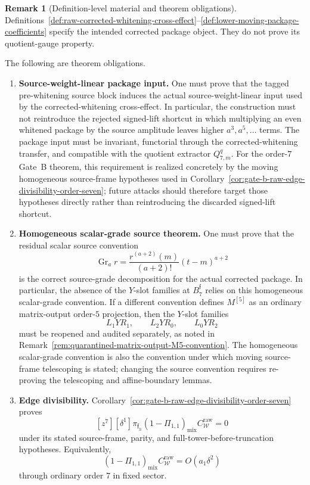 \documentclass[11pt,a4paper]{amsart}
\theoremstyle{plain}
\theoremstyle{definition}
\newtheorem{remark}[theorem]{Remark}
\begin{document}
\begin{remark}[Definition-level material and theorem obligations]
\label{rem:definition-level-material-and-theorem-obligations}
Definitions~\ref{def:raw-corrected-whitening-cross-effect}--\ref{def:lower-moving-package-coefficients}
specify the intended corrected package object.  They do not prove its
quotient-gauge property.

The following are theorem obligations.

\begin{enumerate}
\item \textbf{Source-weight-linear package input.}
One must prove that the tagged pre-whitening source block induces the actual
source-weight-linear input used by the corrected-whitening cross-effect.  In
particular, the construction must not reintroduce the rejected signed-lift
shortcut in which multiplying an even whitened package by the source
amplitude leaves higher \(a^3,a^5,\ldots\) terms.  The package input must be
invariant, functorial through the corrected-whitening transfer, and
compatible with the quotient extractor \(Q_{7,m}^q\).
For the order-\(7\) Gate~B theorem, this requirement is realized concretely
by the moving homogeneous source-frame hypotheses used in
Corollary~\ref{cor:gate-b-raw-edge-divisibility-order-seven}; future
attacks should therefore target those hypotheses directly rather than
reintroducing the discarded signed-lift shortcut.

\item \textbf{Homogeneous scalar-grade source theorem.}
One must prove that the residual scalar source convention
\[
\operatorname{Gr}_a r
=
\frac{r^{(a+2)}(m)}{(a+2)!}(t-m)^{a+2}
\]
is the correct source-grade decomposition for the actual corrected package.
In particular, the absence of the \(Y\)-slot families at
\(B_7^{\mathfrak f}\) relies on this homogeneous scalar-grade convention.
If a different convention defines \(M^{[5]}\) as an ordinary matrix-output
order-\(5\) projection, then the \(Y\)-slot families
\[
L_1YR_1,\qquad L_2YR_0,\qquad L_0YR_2
\]
must be reopened and audited separately, as noted in
Remark~\ref{rem:quarantined-matrix-output-M5-convention}.
The homogeneous scalar-grade convention is also the convention under which
moving source-frame telescoping is stated; changing the source convention
requires re-proving the telescoping and affine-boundary lemmas.

\item \textbf{Edge divisibility.}
Corollary~\ref{cor:gate-b-raw-edge-divisibility-order-seven} proves
\[
[z^7][\delta^1]\pi_{\mathfrak f_h}
(1-\Pi_{1,1})_{\mathrm{mix}}C_{\mathcal W}^{\mathrm{raw}}=0
\]
under its stated source-frame, parity, and full-tower-before-truncation
hypotheses.  Equivalently,
\[
(1-\Pi_{1,1})_{\mathrm{mix}}C_{\mathcal W}^{\mathrm{raw}}
=
O(a_1\delta^2)
\]
through ordinary order \(7\) in fixed sector.


\end{enumerate}
\end{remark}
\end{document}
